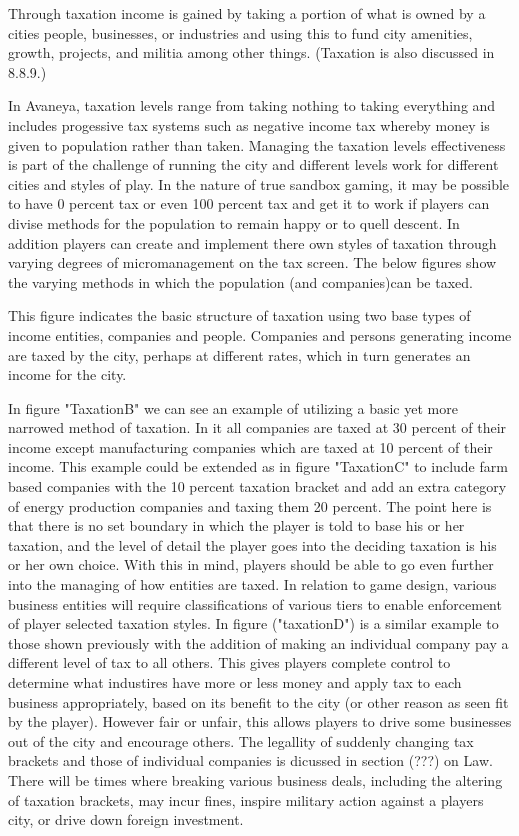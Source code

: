 Through taxation income is gained by taking a portion of what is owned by a cities people, businesses, or industries and using this to fund city amenities, growth, projects, and militia among other things. (Taxation is also discussed in 8.8.9.)

In Avaneya, taxation levels range from taking nothing to taking everything and includes progessive tax systems such as negative income tax whereby money is given to population rather than taken. Managing the taxation levels effectiveness is part of the challenge of running the city and different levels work for different cities and styles of play. In the nature of true sandbox gaming, it may be possible to have 0 percent tax or even 100 percent tax and get it to work if players can divise methods for the population to remain happy or to quell descent. In addition players can create and implement there own styles of taxation through varying degrees of micromanagement on the tax screen. The below figures show the varying methods in which the population (and companies)can be taxed.


This figure indicates the basic structure of taxation using two base types of income entities, companies and people. Companies and persons generating income are taxed by the city, perhaps at different rates, which in turn generates an income for the city.  



In figure "TaxationB" we can see an example of utilizing a basic yet more narrowed method of taxation. In it all companies are taxed at 30 percent of their income except manufacturing companies which are taxed at 10 percent of their income. This example could be extended as in figure "TaxationC" to include farm based companies with the 10 percent taxation bracket and add an extra category of energy production companies and taxing them 20 percent. The point here is that there is no set boundary in which the player is told to base his or her taxation, and the level of detail the player goes into the deciding taxation is his or her own choice. With this in mind, players should be able to go even further into the managing of how entities are taxed. In relation to game design, various business entities will require classifications of various tiers to enable enforcement of player selected taxation styles. 
In figure ("taxationD") is a similar example to those shown previously with the addition of making an individual company pay a different level of tax to all others. This gives players complete control to determine what industires have more or less money and apply tax to each business appropriately, based on its benefit to the city (or other reason as seen fit by the player). However fair or unfair, this allows players to drive some businesses out of the city and encourage others. The legallity of suddenly changing tax brackets and those of individual companies is dicussed in section (???) on Law. There will be times where breaking various business deals, including the altering of taxation brackets, may incur fines, inspire military action against a players city, or drive down foreign investment.

